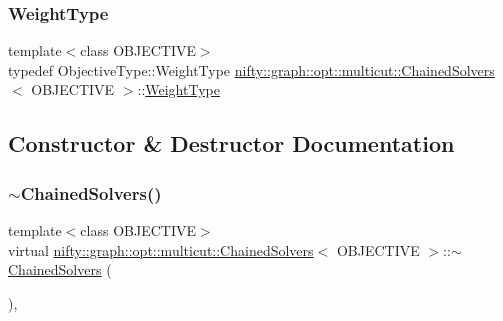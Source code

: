 \mbox{\label{classnifty_1_1graph_1_1opt_1_1multicut_1_1ChainedSolvers_a86f9f19f6bbbbf630356873573f39a02}} 
\subsubsection{\texorpdfstring{Weight\+Type}{WeightType}}
{\footnotesize\ttfamily template$<$class O\+B\+J\+E\+C\+T\+I\+VE$>$ \\
typedef Objective\+Type\+::\+Weight\+Type \hyperlink{classnifty_1_1graph_1_1opt_1_1multicut_1_1ChainedSolvers}{nifty\+::graph\+::opt\+::multicut\+::\+Chained\+Solvers}$<$ O\+B\+J\+E\+C\+T\+I\+VE $>$\+::\hyperlink{classnifty_1_1graph_1_1opt_1_1multicut_1_1ChainedSolvers_a86f9f19f6bbbbf630356873573f39a02}{Weight\+Type}}



\subsection{Constructor \& Destructor Documentation}
\mbox{\label{classnifty_1_1graph_1_1opt_1_1multicut_1_1ChainedSolvers_aa9692bb78b9077ca8639a22094258f9d}} 
\subsubsection{\texorpdfstring{$\sim$\+Chained\+Solvers()}{~ChainedSolvers()}}
{\footnotesize\ttfamily template$<$class O\+B\+J\+E\+C\+T\+I\+VE$>$ \\
virtual \hyperlink{classnifty_1_1graph_1_1opt_1_1multicut_1_1ChainedSolvers}{nifty\+::graph\+::opt\+::multicut\+::\+Chained\+Solvers}$<$ O\+B\+J\+E\+C\+T\+I\+VE $>$\+::$\sim$\hyperlink{classnifty_1_1graph_1_1opt_1_1multicut_1_1ChainedSolvers}{Chained\+Solvers} (\begin{DoxyParamCaption}{ }\end{DoxyParamCaption})\hspace{0.3cm}{\ttfamily [inline]}, {\ttfamily [virtual]}}

